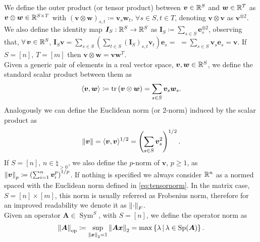 \smallskip

We define the outer product (or tensor product) between $\bm{v} \in \mathbb{R}^S$ and $\bm{w} \in \mathbb{R}^{T}$ as $\bm{v} \otimes \bm{w} \in \mathbb{R}^{S \times T}$ with $(\bm{v} \otimes \bm{w})_{s, t} \coloneqq \bm{v}_s \bm{w}_t$, $\forall s \in S, t \in T$, denoting $\bm{v} \otimes \bm{v}$ as $\bm{v}^{\otimes 2}$. 
We also define the identity map $\bm{I}_S: \mathbb{R}^S \to \mathbb{R}^S$ as $\bm{I}_S \coloneqq \sum_{s \in S} \bm{e}_s^{\otimes 2}$, observing that, $\forall \bm{v} \in \real^S$, $\bm{I}_S \bm{v} = \sum_{s \in S} (\sum_{t \in S} (\bm{I}_S)_{s, t} \bm{v}_t) \bm{e}_s =$ $= \sum_{s \in S} \bm{v}_s \bm{e}_s = \bm{v}$.
If $S = [n]$, $T = [m]$ then $\bm{v} \otimes \bm{w} = \bm{v} \bm{w}^T$. \\
Given a generic pair of elements in a real vector space, $\bm{v}, \bm{w} \in \mathbb{R}^S$, we define the standard scalar product between them as 
\begin{equation*}
	\langle \bm{v}, \bm{w} \rangle \coloneqq \operatorname{tr}\left(\bm{v} \otimes \bm{w}\right) = \sum_{s \in S} \bm{v}_s \bm{w}_s.
\end{equation*}
Analogously we can define the Euclidean norm (or $2$-norm) induced by the scalar product as
\begin{equation} \label{eq:tensornorm}
	\left\lVert\bm{v}\right\rVert = \langle \bm{v}, \bm{v} \rangle^{1/2} = \left(\sum_{s \in S} \bm{v}_s^2\right)^{1/2}.
\end{equation}
If $S = [n]$, $n \in \natural_{> 0}$, we also define the $p$-norm of $\bm{v}$, $p \geq 1$, as $\left\lVert\bm{v}\right\rVert_p \coloneqq \left(\sum_{i = 1}^{n} \bm{v}_i^p\right)^{1/p}$. 
If nothing is specified we always consider $\mathbb{R}^n$ as a normed spaced with the Euclidean norm defined in \cref{eq:tensornorm}. 
In the matrix case, $S = [n] \times [m]$, this norm is usually referred as Frobenius norm, therefore for an improved readability we denote it as $\left\lVert\cdot\right\rVert_F$. \\
Given an operator $\bm{A} \in \operatorname{Sym}^{S}$, with $S = [n]$, we define the operator norm as
\begin{equation*}
	\left\lVert\bm{A}\right\rVert_{\mathrm{op}} \coloneqq \sup_{\left\lVert\bm{x}\right\rVert_2 = 1} \left\lVert\bm{A}\bm{x}\right\rVert_2 = \max\left\{\lambda \, | \, \lambda \in \operatorname{Sp}(\bm{A})\right\}.
\end{equation*}

